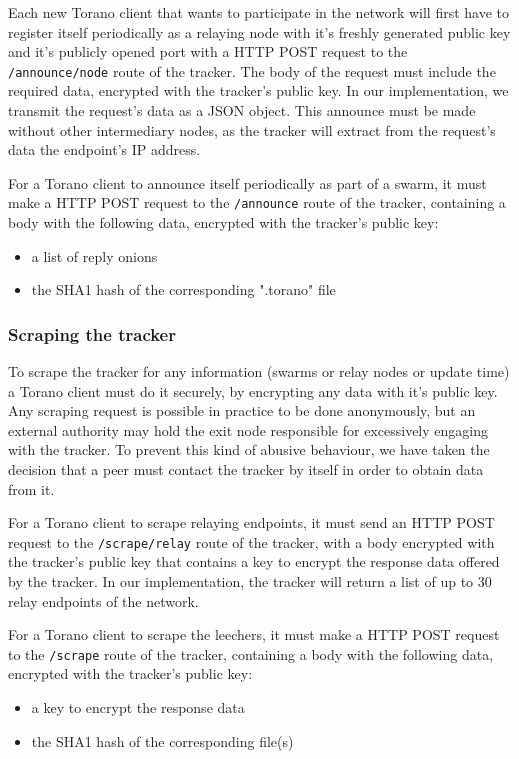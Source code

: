 
\subsubsection*{}
Each new Torano client that wants to participate in the network will first have to register itself periodically as a relaying node with it's freshly generated public key and it's publicly opened port with a HTTP POST request to the \verb|/announce/node| route of the tracker. The body of the request must include the required data, encrypted with the tracker's public key. In our implementation, we transmit the request's data as a JSON object. This announce must be made without other intermediary nodes, as the tracker will extract from the request's data the endpoint's IP address.

For a Torano client to announce itself periodically as part of a swarm, it must make a HTTP POST request to the \verb|/announce| route of the tracker, containing a body with the following data, encrypted with the tracker's public key:
\begin{itemize}[leftmargin=1.5cm,labelindent=0cm]
    \item a list of reply onions 
    \item the SHA1 hash of the corresponding ".torano" file
\end{itemize}

\subsubsection*{Scraping the tracker}
To scrape the tracker for any information (swarms or relay nodes or update time) a Torano client must do it securely, by encrypting any data with it's public key. Any scraping request is possible in practice to be done anonymously, but an external authority may hold the exit node responsible for excessively engaging with the tracker. To prevent this kind of abusive behaviour, we have taken the decision that a peer must contact the tracker by itself in order to obtain data from it.

For a Torano client to scrape relaying endpoints, it must send an HTTP POST request to the \verb|/scrape/relay| route of the tracker, with a body encrypted with the tracker's public key that contains a key to encrypt the response data offered by the tracker. In our implementation, the tracker will return a list of up to 30 relay endpoints of the network. 

For a Torano client to scrape the leechers, it must make a HTTP POST request to the \verb|/scrape| route of the tracker, containing a body with the following data, encrypted with the tracker's public key:
\begin{itemize}[leftmargin=1.5cm,labelindent=0cm]
    \item a key to encrypt the response data 
    \item the SHA1 hash of the corresponding file(s)
\end{itemize}


